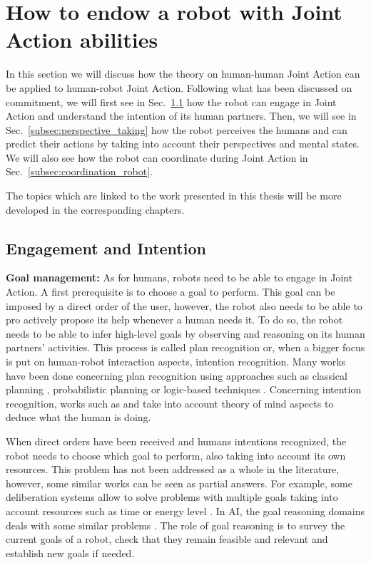 \documentclass[english,a4paper,11pt,twoside]{StyleThese}
\begin{document}
\section{How to endow a robot with Joint Action abilities}

In this section we will discuss how the theory on human-human Joint Action can be applied to human-robot Joint Action. Following what has been discussed on commitment, we will first see in Sec.~\ref{subsec:engagement} how the robot can engage in Joint Action and understand the intention of its human partners. Then, we will see in Sec.~\ref{subsec:perspective_taking} how the robot perceives the humans and can predict their actions by taking into account their perspectives and mental states. We will also see how the robot can coordinate during Joint Action in Sec.~\ref{subsec:coordination_robot}.

The topics which are linked to the work presented in this thesis will be more developed in the corresponding chapters.

\subsection{Engagement and Intention}

\label{subsec:engagement}

\textbf{Goal management:} As for humans, robots need to be able to engage in Joint Action. A first prerequisite is to choose a goal to perform. This goal can be imposed by a direct order of the user, however, the robot also needs to be able to pro actively propose its help whenever a human needs it. To do so, the robot needs to be able to infer high-level goals by observing and reasoning on its human partners’ activities. This process is called plan recognition or, when a bigger focus is put on human-robot interaction aspects, intention recognition. Many works have been done concerning plan recognition using approaches such as classical planning \cite{ramirez2009plan}, probabilistic planning \cite{bui2003general} or logic-based techniques \cite{singla2011abductive}. Concerning intention recognition, works such as \cite{breazeal2009embodied} and \cite{baker2014modeling} take into account theory of mind aspects to deduce what the human is doing.

When direct orders have been received and humans intentions recognized, the robot needs to choose which goal to perform, also taking into account its own resources. This problem has not been addressed as a whole in the literature, however, some similar works can be seen as partial answers. For example, some deliberation systems allow to solve problems with multiple goals taking into account resources such as time \cite{georgeff1987reactive, ghallab1994representation, lemai2004interleaving} or energy level \cite{rabideau1999iterative}. In AI, the goal reasoning domains deals with some similar problems \cite{molineaux2010goal, roberts2016goal}. The role of goal reasoning is to survey the current goals of a robot, check that they remain feasible and relevant and establish new goals if needed.
\end{document}
